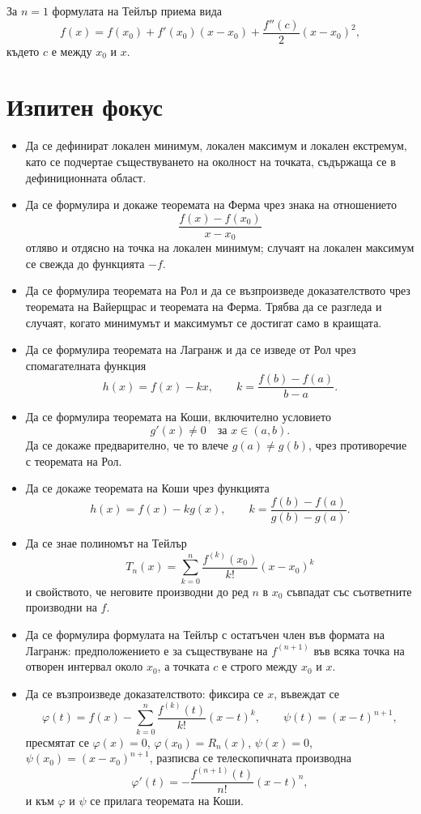 \begin{example}
За $n=1$ формулата на Тейлър приема вида
\[
f(x)=f(x_0)+f'(x_0)(x-x_0)
+\frac{f''(c)}{2}(x-x_0)^2,
\]
където $c$ е между $x_0$ и $x$.
\end{example}

\section{Изпитен фокус}\label{s:32.4}

\begin{itemize}
\item Да се дефинират локален минимум, локален максимум и локален екстремум, като се подчертае съществуването на околност на точката, съдържаща се в дефиниционната област.

\item Да се формулира и докаже теоремата на Ферма чрез знака на отношението
\[
\frac{f(x)-f(x_0)}{x-x_0}
\]
отляво и отдясно на точка на локален минимум; случаят на локален максимум се свежда до функцията $-f$.

\item Да се формулира теоремата на Рол и да се възпроизведе доказателството чрез теоремата на Вайерщрас и теоремата на Ферма. Трябва да се разгледа и случаят, когато минимумът и максимумът се достигат само в краищата.

\item Да се формулира теоремата на Лагранж и да се изведе от Рол чрез спомагателната функция
\[
h(x)=f(x)-kx,
\qquad
k=\frac{f(b)-f(a)}{b-a}.
\]

\item Да се формулира теоремата на Коши, включително условието
\[
g'(x)\ne 0\quad\text{за }x\in(a,b).
\]
Да се докаже предварително, че то влече $g(a)\ne g(b)$, чрез противоречие с теоремата на Рол.

\item Да се докаже теоремата на Коши чрез функцията
\[
h(x)=f(x)-k g(x),
\qquad
k=\frac{f(b)-f(a)}{g(b)-g(a)}.
\]

\item Да се знае полиномът на Тейлър
\[
T_n(x)=\sum_{k=0}^{n}\frac{f^{(k)}(x_0)}{k!}(x-x_0)^k
\]
и свойството, че неговите производни до ред $n$ в $x_0$ съвпадат със съответните производни на $f$.

\item Да се формулира формулата на Тейлър с остатъчен член във формата на Лагранж: предположението е за съществуване на $f^{(n+1)}$ във всяка точка на отворен интервал около $x_0$, а точката $c$ е строго между $x_0$ и $x$.

\item Да се възпроизведе доказателството: фиксира се $x$, въвеждат се
\[
\varphi(t)=f(x)-\sum_{k=0}^{n}\frac{f^{(k)}(t)}{k!}(x-t)^k,
\qquad
\psi(t)=(x-t)^{n+1},
\]
пресмятат се $\varphi(x)=0$, $\varphi(x_0)=R_n(x)$, $\psi(x)=0$, $\psi(x_0)=(x-x_0)^{n+1}$, разписва се телескопичната производна
\[
\varphi'(t)=-\frac{f^{(n+1)}(t)}{n!}(x-t)^n,
\]
и към $\varphi$ и $\psi$ се прилага теоремата на Коши.
\end{itemize}
